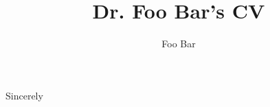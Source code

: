 \documentclass[11pt, letterpaper, extended]{i-am-developer-letter}
\title{Dr. Foo Bar's CV}
\begin{document}
\nameSection{}

\companyHeader




\closing{Sincerely}

\signature{Foo Bar}
\end{document}
